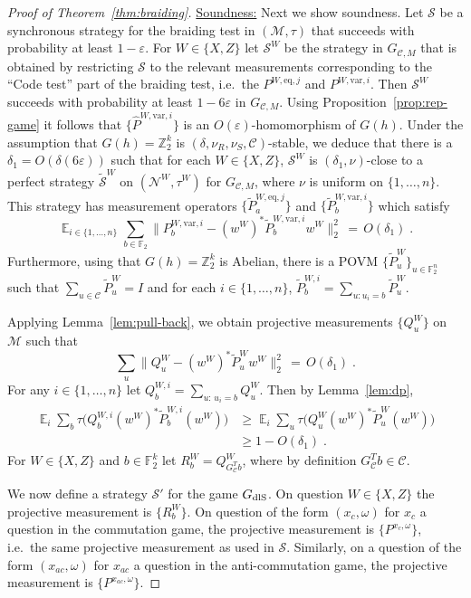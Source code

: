 \documentclass[11pt]{article}
\theoremstyle{definition}
\newcommand{\code}{\mathscr{C}}
\newcommand{\strategy}{\mathscr{S}}
\newcommand{\Id}{\ensuremath{I}}
\DeclareMathOperator*{\Expectation}{\mathbb{E}}
\newcommand{\Es}[1]{\Expectation_{#1}}
\newcommand{\field}{\mathbb{F}_2}
\newcommand{\dlS}{\ensuremath{\rm dlS}}
\newcommand{\F}{\ensuremath{\mathbb{F}}}
\newcommand{\Z}{\ensuremath{\mathbb{Z}}}
\newcommand{\mC}{\ensuremath{\mathcal{C}}}
\newcommand{\mM}{\ensuremath{\mathcal{M}}}
\newcommand{\eps}{\varepsilon}
\newcommand{\mN}{\mathcal{N}}
\newcommand{\eq}{\mathrm{eq}}
\newcommand{\var}{\mathrm{var}}
\begin{document}
\begin{proof}[Proof of Theorem~\ref{thm:braiding}]
\bigskip 

\underline{Soundness:} Next we show soundness. Let $\strategy$ be a synchronous strategy for the braiding test  in  $(\mM,\tau)$ that succeeds with probability at least $1-\eps$. For $W\in\{X,Z\}$ let $\strategy^W$ be the strategy in $G_{\code,M}$ that is obtained by restricting $\strategy$ to the relevant measurements corresponding to the ``Code test'' part of the braiding test, i.e.\ the $P^{W,\eq,j}$ and $P^{W,\var,i}$.  Then $\strategy^W$ succeeds with probability at least $1-6\eps$ in $G_{\code,M}$. Using Proposition~\ref{prop:rep-game} it follows that $\{\widehat{P}^{W,\var,i}\}$ is an $O(\eps)$-homomorphism of $G(h)$. Under the assumption that $G(h)=\Z_2^k$ is $(\delta,\nu_R,\nu_S,\mC)$-stable, we deduce that there is a $\delta_1 = O({\delta(6\eps)})$ such that for each $W\in\{X,Z\}$, $\strategy^W$ is $(\delta_1,\nu)$-close to a perfect strategy $\tilde{\strategy}^W$ on $(\mN^W,\tau^W)$ for $G_{\code,M}$, where $\nu$ is uniform on $\{1,\ldots,n\}$. This strategy has measurement operators $\{ \tilde{P}^{W,\eq,j}_a\}$ and $\{\tilde{P}^{W,\var,i}_b\}$ which satisfy 
\begin{equation}\label{eq:main-0}
\Es{i\in\{1,\ldots,n\}}\sum_{b \in \F_2} \big\|P^{W,\var,i}_b - (w^W)^* \tilde{P}_b^{W,\var,i} w^W \big\|^2_2 \,=\, O(\delta_1)\;.
\end{equation}
Furthermore, using that $G(h)=\Z_2^k$ is Abelian, there is a  POVM $\{\tilde{P}^W_u\}_{u\in \field^n}$ such that $\sum_{u\in \code}\tilde{P}^W_u = \Id$ and for each $i\in \{1,\ldots,n\}$, $\tilde{P}^{W,i}_b = \sum_{u:u_i=b} \tilde{P}^W_u$.
 
Applying Lemma~\ref{lem:pull-back}, we obtain projective measurements $\{Q^W_u\}$ on $\mM$ such that 
\begin{equation}\label{eq:main-1}
\sum_u \big\|Q^W_u - (w^W)^* \tilde{P}_u^W w^W \big\|^2_2 \,=\, O(\delta_1)\;.
\end{equation}
For any $i\in\{1,\ldots,n\}$ let $Q^{W,i}_b = \sum_{u:\,u_i=b}  Q^W_u$. Then by Lemma~\ref{lem:dp},
\begin{align*}
\Es{i}\sum_b \tau\big( Q^{W,i}_b (w^W)^*\tilde{P}^{W,i}_b(w^W) \big)
&\geq \Es{i}\sum_u \tau\big( Q^{W}_u (w^W)^*\tilde{P}^{W}_u(w^W) \big)\\
&\geq 1-O(\delta_1)\;.
\end{align*}
For $W\in\{X,Z\}$ and $b\in \F_2^k$ let $R^W_b = Q^W_{G_\mC^T b}$, where by definition $G_\mC^T b\in \mC$. 

We now define a strategy $\strategy'$ for the game $G_{\dlS}$. On question $W\in \{X,Z\}$ the projective measurement is $\{R^W_b\}$. On question of the form $(x_c,\omega)$ for $x_c$ a question in the commutation game, the projective measurement is $\{P^{x_c,\omega}\}$, i.e.\ the same projective measurement as used in $\strategy$. Similarly, on a question of the form $(x_{ac},\omega)$ for $x_{ac}$ a question in the anti-commutation game, the projective measurement is $\{P^{x_{ac},\omega}\}$.


\end{proof}
\end{document}
